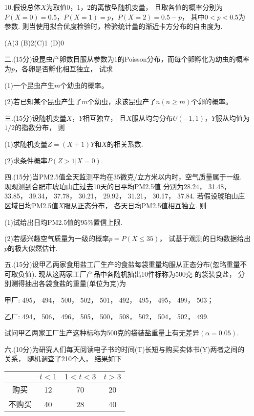 \documentclass[12pt]{article}
\newcommand{\mline}{\underline{\hspace{4em}}}
\newcommand{\abcdf}[4]{(A)#1 \hfill (B)#2\hfill (C)#3 \hfill (D)#4\hfill}
\begin{document}
10.假设总体$X$为取值0，1，2的离散型随机变量， 且取各值的概率分别为$P(X=0)=0.5$，$P(X=1)=p$，$P(X=2)=0.5-p$， 其中$0<p<0.5$为参数. 则当使用拟合优度检验时，检验统计量的渐近卡方分布的自由度为\mline .

\abcdf{3}{2}{1}{0}

二.(15分)设昆虫产卵数目服从参数为1的Poisson分布，而每个卵孵化为幼虫的概率为$p$，各卵是否孵化相互独立，
试求


(1)一个昆虫产生$m$个幼虫的概率。

(2)若已知某个昆虫产生了$m$个幼虫，求该昆虫产了$n (n\ge m)$个卵的概率。



三.(15分)设随机变量$X$，$Y$相互独立， 且$X$服从均匀分布$U(-1, 1)$，$Y$服从均值为$1/2$的指数分布， 则

(1)求随机变量$Z=(X+1)Y$和$X$的相关系数.

(2)求条件概率$P(Z> 1|X=0)$.


四.(15分)当PM2.5值全天监测平均在35微克/立方米以内时，空气质量属于一级. 现观测到合肥市琥珀山庄过去10天的日平均PM2.5值
分别为28.24， 31.48， 33.85， 39.34， 37.78， 30.21， 29.92， 31.21， 30.17， 37.84. 若假设琥珀山庄区域日均PM2.5值$X$服从正态分布，
各天日均PM2.5值相互独立. 则

(1)试给出日均PM2.5值的$95\%$置信上限.

(2)若感兴趣空气质量为一级的概率$p=P(X\le 35)$， 试基于观测的日均数据给出$p$的极大似然估计.


五.(15分)设甲乙两家食用盐工厂生产的食盐每袋重量均服从正态分布(忽略重量不可取负值). 现从这两家工厂产品中各随机抽出10件标称为500克
的袋装食盐， 分别测得抽出各袋食盐的重量(单位为克)为

甲厂: 495， 494， 500， 502， 501， 492， 495， 495， 499， 503；

乙厂: 494， 506， 496， 505， 500， 508， 502， 504， 502， 499.

试问甲乙两家工厂生产这种标称为500克的袋装盐重量上有无差异$(\alpha=0.05)$.


六.(10分)为研究人们每天阅读电子书的时间(T)长短与购买实体书(Y)两者之间的关系， 随机调查了210个人， 结果如下
\begin{table}[htbp!]
\centering
\begin{tabular}{|c|ccc|}
\hline &$t<1$&$1<t<3$&$t>3$\\\hline 购买 & 12 & 70 & 20 \\ 不购买 & 40 & 28 & 40 \\\hline 
\end{tabular}
\end{table}
\end{document}
